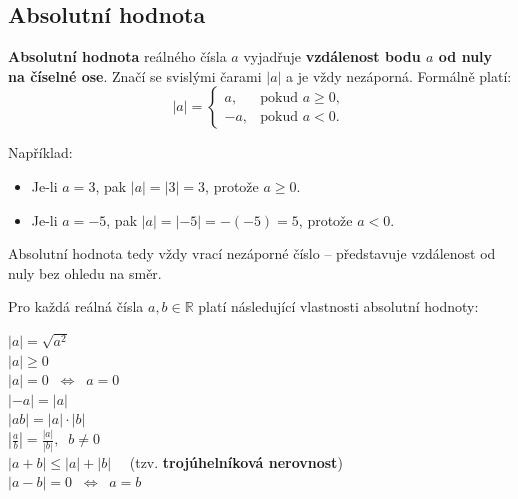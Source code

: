 \documentclass[12pt,a4paper]{article}
\begin{document}
\newpage
\subsection*{Absolutní hodnota}

\begin{definitionbox}
\textbf{Absolutní hodnota} reálného čísla $a$ vyjadřuje \textbf{vzdálenost bodu $a$ od nuly na číselné ose}.  
Značí se svislými čarami $|a|$ a je vždy nezáporná. Formálně platí:
\[
|a| =
\begin{cases}
a, & \text{pokud } a \geq 0, \\
-a, & \text{pokud } a < 0.
\end{cases}
\]
\end{definitionbox}

\begin{notebox}
Například:  
\begin{itemize}
    \item Je-li $a=3$, pak $|a| = |3| = 3$, protože $a \geq 0$.  
    \item Je-li $a=-5$, pak $|a| = |-5| = -(-5) = 5$, protože $a < 0$.  
\end{itemize}
Absolutní hodnota tedy vždy vrací nezáporné číslo – představuje vzdálenost od nuly bez ohledu na směr.
\end{notebox}

Pro každá reálná čísla $a, b \in \mathbb{R}$ platí následující vlastnosti absolutní hodnoty:
\begin{center}
    $\left\lvert a \right\rvert = \sqrt{a^2}$ \\ 
    $\left\lvert a \right\rvert \geq 0$  \\
    $\left\lvert a \right\rvert = 0 \;\;\Leftrightarrow\;\; a = 0$  \\
    $\left\lvert -a \right\rvert = \left\lvert a \right\rvert$  \\
    $\left\lvert ab \right\rvert = \left\lvert a \right\rvert \cdot \left\lvert b \right\rvert$  \\
    $\left\lvert \tfrac{a}{b} \right\rvert = \tfrac{\left\lvert a \right\rvert}{\left\lvert b \right\rvert}, \;\; b \neq 0$  \\
    $\left\lvert a+b \right\rvert \leq \left\lvert a \right\rvert + \left\lvert b \right\rvert \quad$ (tzv. \textbf{trojúhelníková nerovnost})  \\
    $\left\lvert a-b \right\rvert = 0 \;\;\Leftrightarrow\;\; a = b$  \\

\end{center}
\end{document}
